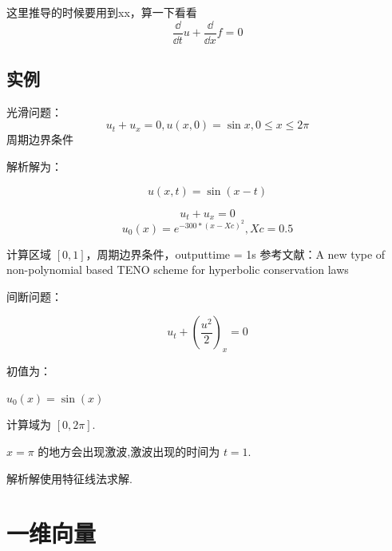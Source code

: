 \documentclass{book}
\begin{document}
这里推导的时候要用到xx，算一下看看
\begin{equation}
    \frac{\dd}{\dd t}u+\frac{\dd}{\dd x}f=0
\end{equation}

\subsection{实例}


\begin{example}{}{}
    光滑问题：
    \begin{equation}
        u_t+u_x=0,u(x,0)=\sin x,0\leqslant x\leqslant 2\pi
    \end{equation}
    周期边界条件


    解析解为：

    \begin{equation}
        u(x,t) = \sin(x-t)
    \end{equation}
\end{example}



\begin{example}
    \begin{equation}
        u_t+u_x=0
    \end{equation}
    \begin{equation}
        u_0(x) = e^{-300*(x-Xc)^2},Xc = 0.5
    \end{equation}

\end{example}
计算区域 $[0,1]$，周期边界条件，outputtime = 1s
参考文献：A new type of non-polynomial based TENO scheme for hyperbolic conservation
laws



\begin{example}{}{}
    间断问题：

    \begin{equation}
        u_{t}+\left(\frac{u^{2}}{2}\right)_{x}=0
    \end{equation}

    初值为：

    $u_0(x)=\sin(x)$

    计算域为 $[0,2\pi]$.

    $x=\pi$ 的地方会出现激波,激波出现的时间为 $t=1$.

    解析解使用特征线法求解.
\end{example}




\section{一维向量}
\end{document}
